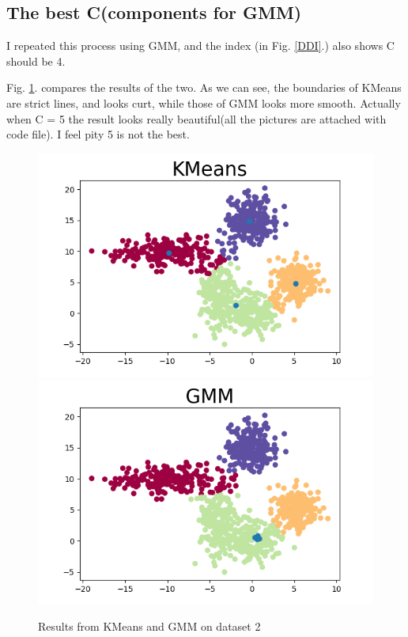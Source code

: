 \documentclass[conference]{IEEEtran}
\begin{document}
\subsection{The best C(components for GMM)}
I repeated this process using GMM, and the index (in Fig. \ref{DDI}.) also shows C should be 4.

Fig. \ref{KG_cmp}. compares the results of the two. As we can see, the boundaries of KMeans are strict lines, and looks curt, while those of GMM looks more smooth. Actually when C = 5 the result looks really beautiful(all the pictures are attached with code file). I feel pity 5 is not the best.

\begin{figure}[htbp]
	{\includegraphics[scale=0.28]{m1p2.png}}
	{\includegraphics[scale=0.28]{m2p2.png}}
	\caption{Results from KMeans and GMM on dataset 2}
	\label{KG_cmp}
\end{figure}
\end{document}
